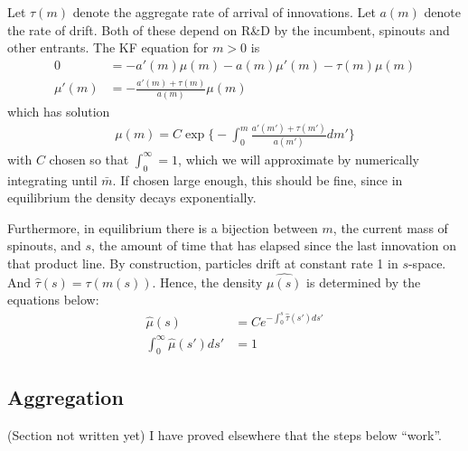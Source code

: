 \documentclass[12pt,english]{article}
\theoremstyle{remark}
\begin{document}
Let $\tau(m)$ denote the aggregate rate of arrival of innovations. Let $a(m)$ denote the rate of drift. Both of these depend on R\&D by the incumbent, spinouts and other entrants. The KF equation for $m > 0$ is 
\begin{align*}
	0 &= -a'(m)\mu(m) - a(m)\mu'(m) - \tau(m)\mu(m) \\
	\mu'(m) &= -\frac{a'(m) + \tau(m)}{a(m)} \mu(m)
\end{align*}
which has solution 
\begin{align*}
	\mu(m) = C\exp \Bigg\{ - \int_0^m \frac{a'(m') + \tau(m')}{a(m')} dm'    \Bigg\}
\end{align*}
with $C$ chosen so that $\int_0^{\infty} = 1$, which we will approximate by numerically integrating until $\bar{m}$. If chosen large enough, this should be fine, since in equilibrium the density decays exponentially. 

Furthermore, in equilibrium there is a bijection between $m$, the current mass of spinouts, and $s$, the amount of time that has elapsed since the last innovation on that product line. By construction, particles drift at constant rate 1 in $s$-space. And $\hat{\tau}(s) = \tau(m(s))$. Hence, the density $\hat{\mu(s)}$ is determined by the equations below:
\begin{align*}
	\hat{\mu}(s) &= Ce^{-\int_0^s \hat{\tau}(s')ds'} \\
	\int_0^{\infty} \hat{\mu}(s') ds' &= 1
\end{align*}

\subsection{Aggregation}

(Section not written yet) I have proved elsewhere that the steps below ``work''. 
\end{document}
